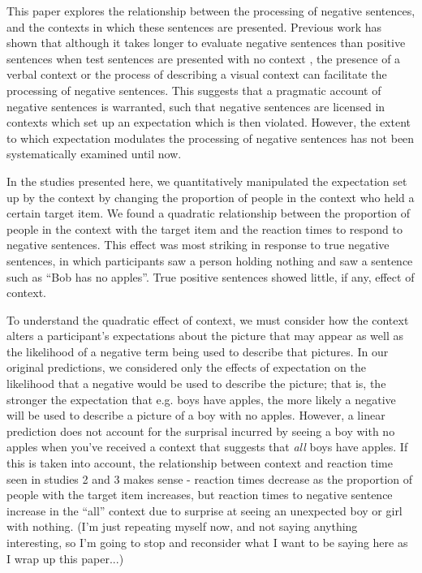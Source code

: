 \documentclass[10pt,letterpaper]{article}
\begin{document}
This paper explores the relationship between the processing of negative sentences, and the contexts in which these sentences are presented.  Previous work has shown that although it takes longer to evaluate negative sentences than positive sentences when test sentences are presented with no context \cite{carpenter1975, just1971, just1976, hclark1972}, the presence of a verbal context \cite{dale2011, glenberg1999, ludtke2006} or the process of describing a visual context \cite{wason1965} can facilitate the processing of negative sentences.  This suggests that a pragmatic account of negative sentences is warranted, such that negative sentences are licensed in contexts which set up an expectation which is then violated.  However, the extent to which expectation modulates the processing of negative sentences has not been systematically examined until now.  

In the studies presented here, we quantitatively manipulated the expectation set up by the context by changing the proportion of people in the context who held a certain target item.  We found a quadratic relationship between the proportion of people in the context with the target item and the reaction times to respond to negative sentences.  This effect was most striking in response to true negative sentences, in which participants saw a person holding nothing and saw a sentence such as ``Bob has no apples''.  True positive sentences showed little, if any, effect of context.  

To understand the quadratic effect of context, we must consider how the context alters a participant's expectations about the picture that may appear as well as the likelihood of a negative term being used to describe that pictures.  In our original predictions, we considered only the effects of expectation on the likelihood that a negative would be used to describe the picture; that is, the stronger the expectation that e.g. boys have apples, the more likely a negative will be used to describe a picture of a boy with no apples.  However, a linear prediction does not account for the surprisal incurred by seeing a boy with no apples when you've received a context that suggests that \emph{all} boys have apples.  If this is taken into account, the relationship between context and reaction time seen in studies 2 and 3 makes sense - reaction times decrease as the proportion of people with the target item increases, but reaction times to negative sentence increase in the ``all'' context due to surprise at seeing an unexpected boy or girl with nothing.  (I'm just repeating myself now, and not saying anything interesting, so I'm going to stop and reconsider what I want to be saying here as I wrap up this paper...)
\end{document}
